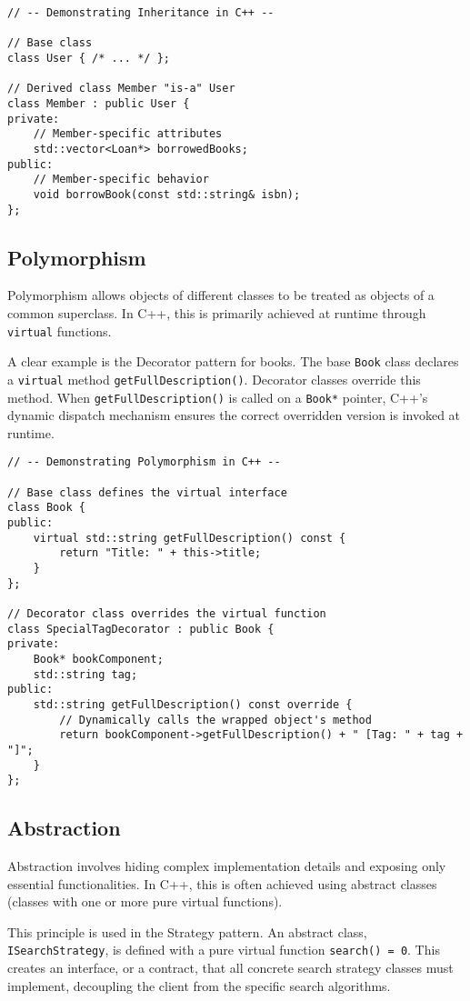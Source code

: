 \begin{verbatim}
// -- Demonstrating Inheritance in C++ --

// Base class
class User { /* ... */ };

// Derived class Member "is-a" User
class Member : public User {
private:
    // Member-specific attributes
    std::vector<Loan*> borrowedBooks;
public:
    // Member-specific behavior
    void borrowBook(const std::string& isbn);
};
\end{verbatim}

\subsection{Polymorphism}
Polymorphism allows objects of different classes to be treated as objects of a common superclass. In C++, this is primarily achieved at runtime through \texttt{virtual} functions.

A clear example is the Decorator pattern for books. The base \texttt{Book} class declares a \texttt{virtual} method \texttt{getFullDescription()}. Decorator classes override this method. When \texttt{getFullDescription()} is called on a \texttt{Book*} pointer, C++'s dynamic dispatch mechanism ensures the correct overridden version is invoked at runtime.

\begin{verbatim}
// -- Demonstrating Polymorphism in C++ --

// Base class defines the virtual interface
class Book {
public:
    virtual std::string getFullDescription() const {
        return "Title: " + this->title;
    }
};

// Decorator class overrides the virtual function
class SpecialTagDecorator : public Book {
private:
    Book* bookComponent;
    std::string tag;
public:
    std::string getFullDescription() const override {
        // Dynamically calls the wrapped object's method
        return bookComponent->getFullDescription() + " [Tag: " + tag + "]";
    }
};
\end{verbatim}

\subsection{Abstraction}
Abstraction involves hiding complex implementation details and exposing only essential functionalities. In C++, this is often achieved using abstract classes (classes with one or more pure virtual functions).

This principle is used in the Strategy pattern. An abstract class, \texttt{ISearchStrategy}, is defined with a pure virtual function \texttt{search() = 0}. This creates an interface, or a contract, that all concrete search strategy classes must implement, decoupling the client from the specific search algorithms.

